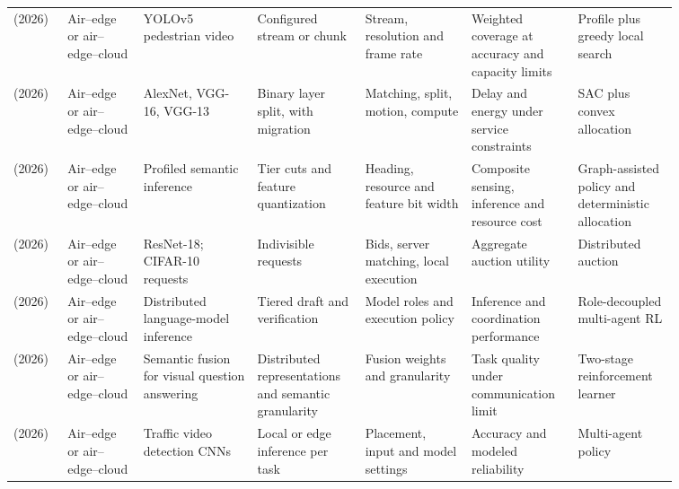 \begin{table}[!tp]
\begin{tabular}{@{}Y{0.0705\linewidth}Y{0.1043\linewidth}Y{0.1589\linewidth}Y{0.1363\linewidth}Y{0.1419\linewidth}Y{0.1175\linewidth}Y{0.1307\linewidth}@{}}
\cite{R0036}\newline\mbox{(2026)} & Air--edge or air--edge--cloud & YOLOv5 pedestrian video & Configured stream or chunk & Stream, resolution and frame rate & Weighted coverage at accuracy and capacity limits & Profile plus greedy local search \\
\cite{R0045}\newline\mbox{(2026)} & Air--edge or air--edge--cloud & AlexNet, VGG-16, VGG-13 & Binary layer split, with migration & Matching, split, motion, compute & Delay and energy under service constraints & SAC plus convex allocation \\
\cite{R0054}\newline\mbox{(2026)} & Air--edge or air--edge--cloud & Profiled semantic inference & Tier cuts and feature quantization & Heading, resource and feature bit width & Composite sensing, inference and resource cost & Graph-assisted policy and deterministic allocation \\
\cite{R0058}\newline\mbox{(2026)} & Air--edge or air--edge--cloud & ResNet-18; CIFAR-10 requests & Indivisible requests & Bids, server matching, local execution & Aggregate auction utility & Distributed auction \\
\cite{R0063}\newline\mbox{(2026)} & Air--edge or air--edge--cloud & Distributed language-model inference & Tiered draft and verification & Model roles and execution policy & Inference and coordination performance & Role-decoupled multi-agent RL \\
\cite{R0107}\newline\mbox{(2026)} & Air--edge or air--edge--cloud & Semantic fusion for visual question answering & Distributed representations and semantic granularity & Fusion weights and granularity & Task quality under communication limit & Two-stage reinforcement learner \\
\cite{R0137}\newline\mbox{(2026)} & Air--edge or air--edge--cloud & Traffic video detection CNNs & Local or edge inference per task & Placement, input and model settings & Accuracy and modeled reliability & Multi-agent policy \\
\bottomrule
\end{tabular}
\end{table}
